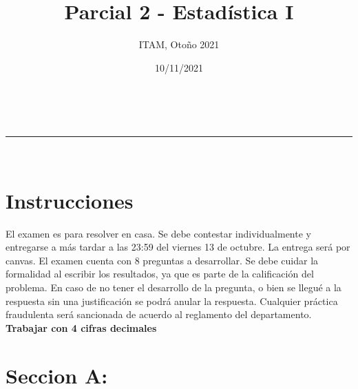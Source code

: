 \documentclass[addpoints]{exam}
\makeatletter
\newcommand{\linia}{\rule{\linewidth}{0.5pt}}
\theoremstyle{mytheor}
\renewcommand{\maketitle}{
    \begin{center}
    \vspace{2ex}
    {\huge \textsc{\@title}}
    \vspace{1ex}
    \\
    \linia\\
    \@author \hfill \@date
    \vspace{4ex}
    \end{center}
  }
\makeatother
\begin{document}
  
  \title{Parcial 2 - Estadística I}
  
  \author{ITAM, Otoño 2021}
  
  \date{10/11/2021}
  
  \maketitle
  
  \section*{Instrucciones}
  El examen es para resolver en casa. Se debe contestar individualmente y entregarse a más tardar a las 23:59 del viernes 13 de octubre. La entrega será por canvas. El examen cuenta con 8 preguntas a desarrollar. Se debe cuidar la formalidad al escribir los resultados, ya que es parte de la calificación del problema. En caso de no tener el desarrollo de la pregunta, o bien se llegué a la respuesta sin una justificación se podrá anular la respuesta. Cualquier práctica fraudulenta será sancionada de acuerdo al reglamento del departamento. \textbf{Trabajar con 4 cifras decimales}
  
\vspace{10pt}

  \section*{Seccion A: }
  
\end{document}
